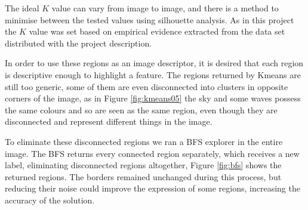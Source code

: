 \documentclass[12pt,a4paper]{article}
\begin{document}
	The ideal $K$ value can vary from image to image, and there is a method to minimise between the tested values using silhouette analysis. As in this project the $K$ value was set based on empirical evidence extracted from the data set distributed with the project description.

	In order to use these regions as an image descriptor, it is desired that each region is descriptive enough to highlight a feature. The regions returned by Kmeans are still too generic, some of them are even disconnected into clusters in opposite corners of the image, as in Figure \ref{fig:kmeans05} the sky and some waves possess the same colours and so are seen as the same region, even though they are disconnected and represent different things in the image.

\newpage

	To eliminate these disconnected regions we ran a BFS explorer in the entire image. The BFS returns every connected region separately, which receives a new label, eliminating disconnected regions altogether, Figure \ref{fig:bfs} shows the returned regions.
	The borders remained unchanged during this process, but reducing their noise could improve the expression of some regions, increasing the accuracy of the solution.
\end{document}
